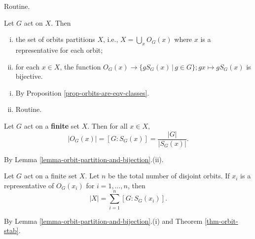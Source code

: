\begin{sketch}
	Routine.
\end{sketch}
\begin{lemma} \label{lemma-orbit-partition-and-bijection}
	Let $G$  act on $X$. Then
	\begin{enumerate}[(i)]
		\item the set of orbits partitions $X$, i.e., $X = \bigcup_x O_G(x)$ where $x$ is a representative for each orbit;
		\item for each $x\in X$, the function $O_G(x) \rightarrow \{gS_G(x)\,|\, g\in G\}; gx\mapsto gS_G(x)$ is bijective.
	\end{enumerate}
\end{lemma}
\begin{sketch}
	\begin{enumerate}[(i)]
		\item By Proposition \ref{prop-orbits-are-eqv-classes}.
		\item Routine. \qedhere
	\end{enumerate}
\end{sketch}
\begin{theorem} \label{thm-orbit-stab}
	Let $G$ act on a \textbf{finite} set $X$. Then for all $x\in X$,
	\begin{equation*}
		|O_G(x)| = [G:S_G(x)] = \frac{|G|}{|S_G(x)|}.
	\end{equation*}
\end{theorem}
\begin{sketch}
	By Lemma \ref{lemma-orbit-partition-and-bijection}.(ii).
\end{sketch}
\begin{corollary} \label{cor-|X|=sum_[G:S_G(x_i)]}
	Let $G$ act on a finite set $X$. Let $n$ be the total number of disjoint orbits. If $x_i$ is a representative of $O_G(x_i)$ for $i=1,\dots, n$, then
	\begin{equation*}
		|X| = \sum_{i=1}^n [G:S_G(x_i)].
	\end{equation*}
\end{corollary}
\begin{sketch}
	By  Lemma \ref{lemma-orbit-partition-and-bijection}.(i) and Theorem \ref{thm-orbit-stab}.
\end{sketch}

